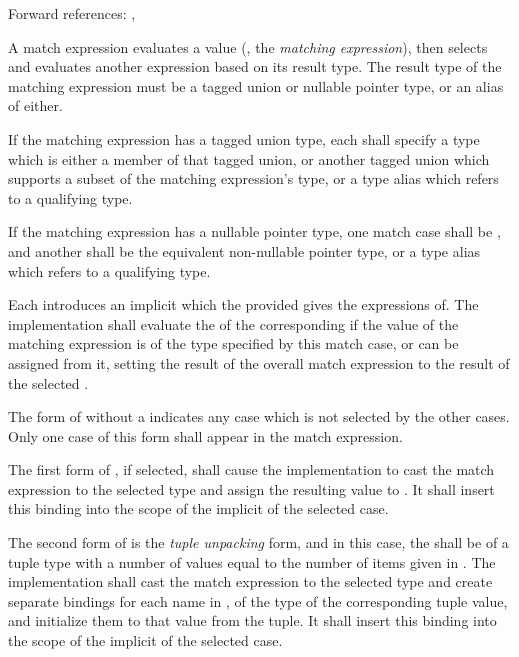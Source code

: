 Forward references: , 

\specsubsubitem
A match expression evaluates a value (, the
\textit{matching expression}), then selects and evaluates another expression
based on its result type. The result type of the matching expression must be a
tagged union or nullable pointer type, or an alias of either.

\specsubsubitem
If the matching expression has a tagged union type, each
 shall specify a type which is either a member of that
tagged union, or another tagged union which supports a subset of the matching
expression's type, or a type alias which refers to a qualifying type.

\specsubsubitem
If the matching expression has a nullable pointer type, one match case shall be
, and another shall be the equivalent non-nullable pointer type,
or a type alias which refers to a qualifying type.

\specsubsubitem
Each  introduces an implicit
 which the provided
 gives the expressions of. The implementation
shall evaluate the  of the corresponding
 if the value of the matching expression is of the type
specified by this match case, or can be assigned from it, setting the result of
the overall match expression to the result of the selected
.



\specsubsubitem
The form of  without a  indicates any
case which is not selected by the other cases. Only one case of this form shall
appear in the match expression.

\specsubsubitem
The first form of , if selected, shall cause the
implementation to cast the match expression to the selected type and assign the
resulting value to . It shall insert this binding into the
scope of the implicit  of the selected case.

\specsubsubitem
The second form of  is the \textit{tuple unpacking}
form, and in this case, the  shall be of a tuple type
with a number of values equal to the number of items given in
. The implementation shall cast the match expression
to the selected type and create separate bindings for each name in
, of the type of the corresponding tuple value, and
initialize them to that value from the tuple. It shall insert this binding into
the scope of the implicit  of the selected
case.

